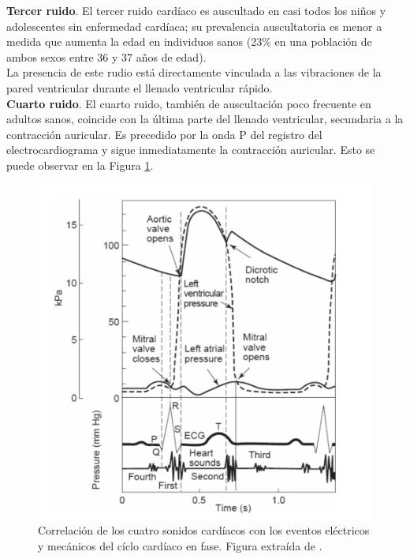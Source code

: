     \indent \textbf{Tercer ruido}. El tercer ruido cardíaco es auscultado en casi todos los niños y adolescentes sin
enfermedad cardíaca; su prevalencia auscultatoria es menor a medida que aumenta la edad en individuos sanos (23\% en
una población de ambos sexos entre 36 y 37 años de edad). \\
    \indent La presencia de este rudio está directamente vinculada a las vibraciones de la pared ventricular durante
el llenado ventricular rápido. \\
    \indent \textbf{Cuarto ruido}. El cuarto ruido, también de auscultación poco frecuente en adultos sanos,
coincide con la última parte del llenado ventricular, secundaria a la contracción auricular. Es precedido por la
onda P del registro del electrocardiograma y sigue inmediatamente la contracción auricular. Esto se puede observar
en la Figura \ref{fig:diagrams_in_phase}.
    
    \begin{figure}[H]
        \centering
        \includegraphics[scale=0.65]{sections/chapter-02/images/diagrams_in_phase.png}
        \caption[Correlación  de  los  cuatro  sonidos  cardíacos  con  los  eventos  eléctricos y mecánicos del
        cíclo cardíaco en fase.]{Correlación  de  los  cuatro  sonidos  cardíacos  con  los  eventos  eléctricos y
        mecánicos del cíclo cardíaco en fase. Figura extraída de \cite{pp:abbas2014}.}
        \label{fig:diagrams_in_phase}
    \end{figure}
    
